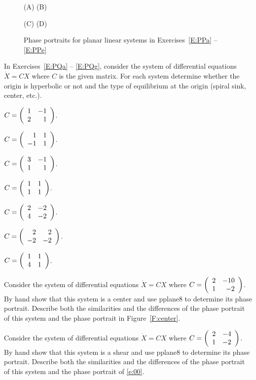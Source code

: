\documentclass{ximera}
\begin{document}
\begin{figure*}[htb]
\centerline{(A) \hspace{2.7in} (B)}
           \centerline{%
           }
\centerline{(C) \hspace{2.7in} (D)}
           \centerline{%
           }
\caption{Phase portraits for planar linear systems in
Exercises~\protect\ref{E:PPa} -- \protect\ref{E:PPe}}
\label{F:PP}
\end{figure*}

\noindent In Exercises~\ref{E:PQa} -- \ref{E:PQg}, consider the system of
differential equations $\dot{X}=CX$ where $C$ is the given matrix.  For each
system determine whether the origin is hyperbolic or not and the type of
equilibrium at the origin (spiral sink, center, etc.).
\begin{exercise}  \label{E:PQa}
$C = \left(\begin{array}{rr} 1 & -1\\ 2 &1\end{array}\right)$.
\end{exercise}
\begin{exercise}  \label{E:PQb}
$C = \left(\begin{array}{rr} 1 & 1\\ -1 &1\end{array}\right)$.
\end{exercise}
\begin{exercise}  \label{E:PQc}
$C = \left(\begin{array}{rr} 3 & -1\\ 1 &1\end{array}\right)$.
\end{exercise}
\begin{exercise}  \label{E:PQd}
$C = \left(\begin{array}{rr} 1 & 1\\ 1 &1\end{array}\right)$.
\end{exercise}
\begin{exercise}  \label{E:PQe}
$C = \left(\begin{array}{rr} 2 & -2\\ 4 &-2\end{array}\right)$.
\end{exercise}
\begin{exercise}  \label{E:PQf}
$C = \left(\begin{array}{rr} 2 & 2\\ -2 &-2\end{array}\right)$.
\end{exercise}
\begin{exercise}  \label{E:PQg}
$C = \left(\begin{array}{rr} 1 & 1\\ 4 &1\end{array}\right)$.
\end{exercise}

\CEXER

\begin{exercise}  \label{E:notcircles}
Consider the system of differential equations $\dot{X}=CX$ where
$C=\left(\begin{array}{rr} 2 & -10\\ 1 &-2\end{array}\right)$.  By hand show that this system is a center and
use {\sf pplane8} to determine its phase portrait.  Describe both the
similarities and the differences of the phase portrait of this system
and the phase portrait in Figure~\ref{F:center}.
\end{exercise}

\begin{exercise} \label{c6.9.5}
Consider the system of differential equations $\dot{X}=CX$ where
$C=\left(\begin{array}{rr} 2 & -4\\ 1 &-2\end{array}\right)$.  By hand show that this system is a shear and
use {\sf pplane8} to determine its phase portrait.  Describe both the
similarities and the differences of the phase portrait of this system
and the phase portrait of \eqref{e:00}.
\end{exercise}
\end{document}

